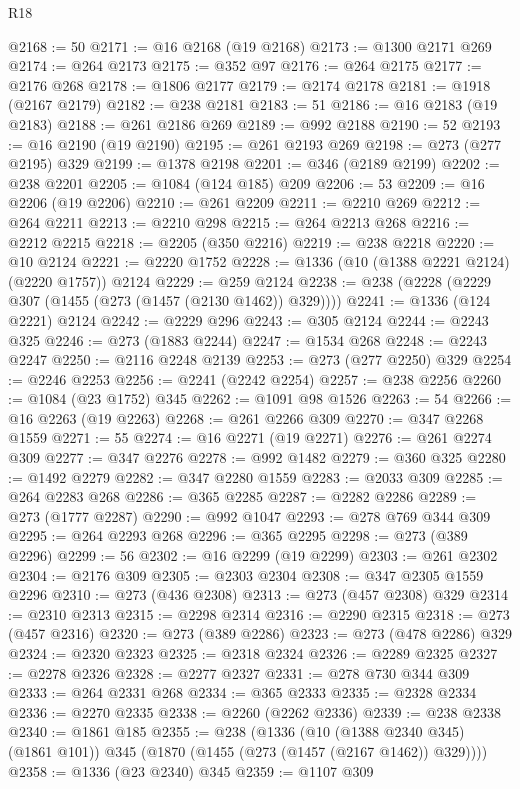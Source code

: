 \begin{lexlean}{R18}
\begin{coremodule}
{{{{{{{{{{{{{{{{{{{@2168 := 50
@2171 := @16 @2168 (@19 @2168)
@2173 := @1300 @2171 @269
@2174 := @264 @2173
@2175 := @352 @97
@2176 := @264 @2175
@2177 := @2176 @268
@2178 := @1806 @2177
@2179 := @2174 @2178
@2181 := @1918 (@2167 @2179)
@2182 := @238 @2181
@2183 := 51
@2186 := @16 @2183 (@19 @2183)
@2188 := @261 @2186 @269
@2189 := @992 @2188
@2190 := 52
@2193 := @16 @2190 (@19 @2190)
@2195 := @261 @2193 @269
@2198 := @273 (@277 @2195) @329
@2199 := @1378 @2198
@2201 := @346 (@2189 @2199)
@2202 := @238 @2201
@2205 := @1084 (@124 @185) @209
@2206 := 53
@2209 := @16 @2206 (@19 @2206)
@2210 := @261 @2209
@2211 := @2210 @269
@2212 := @264 @2211
@2213 := @2210 @298
@2215 := @264 @2213 @268
@2216 := @2212 @2215
@2218 := @2205 (@350 @2216)
@2219 := @238 @2218
@2220 := @10 @2124
@2221 := @2220 @1752
@2228 := @1336 (@10 (@1388 @2221 @2124) (@2220 @1757)) @2124
@2229 := @259 @2124
@2238 := @238 (@2228 (@2229 @307 (@1455 (@273 (@1457 (@2130 @1462)) @329))))
@2241 := @1336 (@124 @2221) @2124
@2242 := @2229 @296
@2243 := @305 @2124
@2244 := @2243 @325
@2246 := @273 (@1883 @2244)
@2247 := @1534 @268
@2248 := @2243 @2247
@2250 := @2116 @2248 @2139
@2253 := @273 (@277 @2250) @329
@2254 := @2246 @2253
@2256 := @2241 (@2242 @2254)
@2257 := @238 @2256
@2260 := @1084 (@23 @1752) @345
@2262 := @1091 @98 @1526
@2263 := 54
@2266 := @16 @2263 (@19 @2263)
@2268 := @261 @2266 @309
@2270 := @347 @2268 @1559
@2271 := 55
@2274 := @16 @2271 (@19 @2271)
@2276 := @261 @2274 @309
@2277 := @347 @2276
@2278 := @992 @1482
@2279 := @360 @325
@2280 := @1492 @2279
@2282 := @347 @2280 @1559
@2283 := @2033 @309
@2285 := @264 @2283 @268
@2286 := @365 @2285
@2287 := @2282 @2286
@2289 := @273 (@1777 @2287)
@2290 := @992 @1047
@2293 := @278 @769 @344 @309
@2295 := @264 @2293 @268
@2296 := @365 @2295
@2298 := @273 (@389 @2296)
@2299 := 56
@2302 := @16 @2299 (@19 @2299)
@2303 := @261 @2302
@2304 := @2176 @309
@2305 := @2303 @2304
@2308 := @347 @2305 @1559 @2296
@2310 := @273 (@436 @2308)
@2313 := @273 (@457 @2308) @329
@2314 := @2310 @2313
@2315 := @2298 @2314
@2316 := @2290 @2315
@2318 := @273 (@457 @2316)
@2320 := @273 (@389 @2286)
@2323 := @273 (@478 @2286) @329
@2324 := @2320 @2323
@2325 := @2318 @2324
@2326 := @2289 @2325
@2327 := @2278 @2326
@2328 := @2277 @2327
@2331 := @278 @730 @344 @309
@2333 := @264 @2331 @268
@2334 := @365 @2333
@2335 := @2328 @2334
@2336 := @2270 @2335
@2338 := @2260 (@2262 @2336)
@2339 := @238 @2338
@2340 := @1861 @185
@2355 := @238
    (@1336
      (@10 (@1388 @2340 @345) (@1861 @101))
      @345
      (@1870 (@1455 (@273 (@1457 (@2167 @1462)) @329))))
@2358 := @1336 (@23 @2340) @345
@2359 := @1107 @309
}}}}}}}}}}}}}}}}}}}
\end{coremodule}
\end{lexlean}
